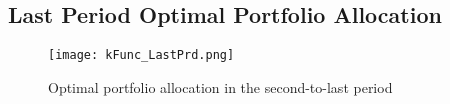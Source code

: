 \subsection{Last Period Optimal Portfolio Allocation}

\begin{figure}[h]
    \centering
    \texttt{[image: kFunc\_LastPrd.png]}
    \caption{Optimal portfolio allocation in the second-to-last period}
    \label{fig:last_prd_portfolio}
\end{figure}